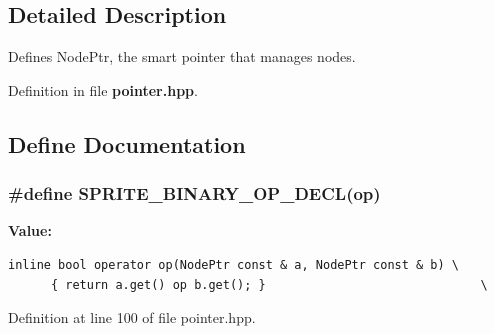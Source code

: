 \subsection{Detailed Description}
Defines Node\-Ptr, the smart pointer that manages nodes. 



Definition in file {\bf pointer.hpp}.

\subsection{Define Documentation}
\subsubsection{\setlength{\rightskip}{0pt plus 5cm}\#define SPRITE\_\-BINARY\_\-OP\_\-DECL(op)}\label{pointer_8hpp_a0}


{\bf Value:}

\footnotesize\begin{verbatim}inline bool operator op(NodePtr const & a, NodePtr const & b) \
      { return a.get() op b.get(); }                              \
\end{verbatim}\normalsize 


Definition at line 100 of file pointer.hpp.